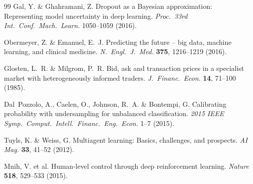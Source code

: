 \documentclass[12pt]{article}
\begin{document}
\begin{thebibliography}{99}
Gal, Y. \& Ghahramani, Z.
Dropout as a Bayesian approximation: Representing model uncertainty
in deep learning.
\textit{Proc.\ 33rd Int.\ Conf.\ Mach.\ Learn.} 1050--1059 (2016).

Obermeyer, Z. \& Emanuel, E.~J.
Predicting the future -- big data, machine learning, and clinical
medicine.
\textit{N.\ Engl.\ J.\ Med.} \textbf{375}, 1216--1219 (2016).

Glosten, L.~R. \& Milgrom, P.~R.
Bid, ask and transaction prices in a specialist market with
heterogeneously informed traders.
\textit{J.\ Financ.\ Econ.} \textbf{14}, 71--100 (1985).

Dal~Pozzolo, A., Caelen, O., Johnson, R.~A. \& Bontempi, G.
Calibrating probability with undersampling for unbalanced
classification.
\textit{2015 IEEE Symp.\ Comput.\ Intell.\ Financ.\ Eng.\ Econ.}
1--7 (2015).

Tuyls, K. \& Weiss, G.
Multiagent learning: Basics, challenges, and prospects.
\textit{AI Mag.} \textbf{33}, 41--52 (2012).

Mnih, V. et al.
Human-level control through deep reinforcement learning.
\textit{Nature} \textbf{518}, 529--533 (2015).

\end{thebibliography}
\end{document}
